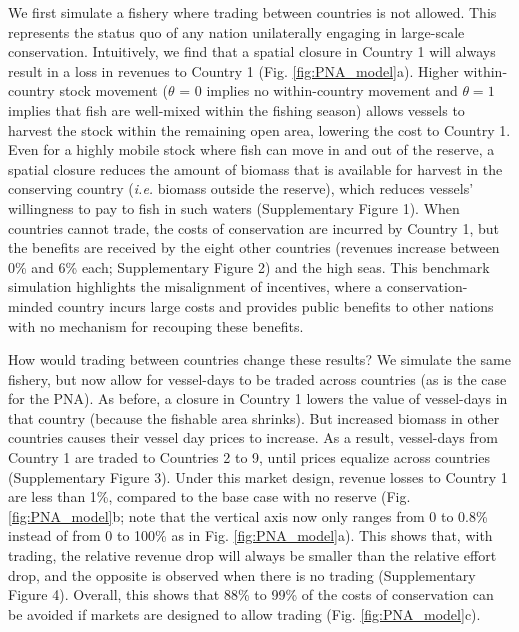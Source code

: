 \documentclass[12pt]{article}
\begin{document}
We first simulate a fishery where trading between countries is not allowed. This represents the status quo of any nation unilaterally engaging in large-scale conservation. Intuitively, we find that a spatial closure in Country 1 will always result in a loss in revenues to Country 1 (Fig. \ref{fig:PNA_model}a). Higher within-country stock movement ($\theta$ = 0 implies no within-country movement and $\theta = 1$ implies that fish are well-mixed within the fishing season) allows vessels to harvest the stock within the remaining open area, lowering the cost to Country 1. Even for a highly mobile stock where fish can move in and out of the reserve, a spatial closure reduces the amount of biomass that is available for harvest in the conserving country (\emph{i.e.} biomass outside the reserve), which reduces vessels' willingness to pay to fish in such waters (Supplementary Figure 1). When countries cannot trade, the costs of conservation are incurred by Country 1, but the benefits are received by the eight other countries (revenues increase between 0\% and 6\% each; Supplementary Figure 2) and the high seas. This benchmark simulation highlights the misalignment of incentives, where a conservation-minded country incurs large costs and provides public benefits to other nations with no mechanism for recouping these benefits.

How would trading between countries change these results? We simulate the same fishery, but now allow for vessel-days to be traded across countries (as is the case for the PNA). As before, a closure in Country 1 lowers the value of vessel-days in that country (because the fishable area shrinks). But increased biomass in other countries causes their vessel day prices to increase. As a result, vessel-days from Country 1 are traded to Countries 2 to 9, until prices equalize across countries (Supplementary Figure 3). Under this market design, revenue losses to Country 1 are less than 1\%, compared to the base case with no reserve (Fig. \ref{fig:PNA_model}b; note that the vertical axis now only ranges from 0 to 0.8\% instead of from 0 to 100\% as in Fig. \ref{fig:PNA_model}a). This shows that, with trading, the relative revenue drop will always be smaller than the relative effort drop, and the opposite is observed when there is no trading (Supplementary Figure 4). Overall, this shows that 88\% to 99\% of the costs of conservation can be avoided if markets are designed to allow trading (Fig. \ref{fig:PNA_model}c).
\end{document}
